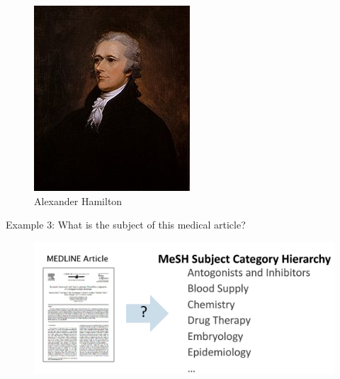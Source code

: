 \documentclass{book}
\begin{document}
\begin{center}
\begin{figure}[h]
\begin{minipage}{0.3\textwidth}
                \includegraphics[width=\linewidth]{pics/hamilton.png}
                \caption{Alexander Hamilton}
            \end{minipage}
        \end{figure}
    \end{center}


Example 3: What is the subject of this medical article?

\begin{figure}[h]
\includegraphics[scale = 0.2]{pics/medarticle.png}
\end{figure}
\end{document}
